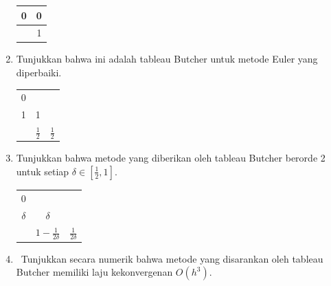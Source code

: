 \begin{enumerate}
\begin{center}
\begin{tabular}{c|c}
0 & 0\tabularnewline
\hline 
 & 1\tabularnewline
\end{tabular}
\par\end{center}
\item \label{exc:ode-adaptive-4}Tunjukkan bahwa ini adalah tableau Butcher
untuk metode Euler yang diperbaiki. \hasasolution {}

\begin{center}
\begin{tabular}{c|cc}
0 &  & \tabularnewline
1 & 1 & \tabularnewline
\hline 
 & $\frac{1}{2}$ & $\frac{1}{2}$\tabularnewline
\end{tabular}
\par\end{center}
\item \label{exc:ode-adaptive-5}Tunjukkan bahwa metode yang diberikan oleh
tableau Butcher berorde 2 untuk setiap $\delta\in[\frac{1}{2},1]$.

\begin{center}
\begin{tabular}{c|cc}
0 &  & \tabularnewline
$\delta$ & $\delta$ & \tabularnewline
\hline 
 & $1-\frac{1}{2\delta}$ & $\frac{1}{2\delta}$\tabularnewline
\end{tabular}
\par\end{center}
\item \octave\ \label{exc:ode-adaptive-7}Tunjukkan secara numerik bahwa
metode yang disarankan oleh tableau Butcher memiliki laju kekonvergenan
$O(h^{3})$.


\end{enumerate}

